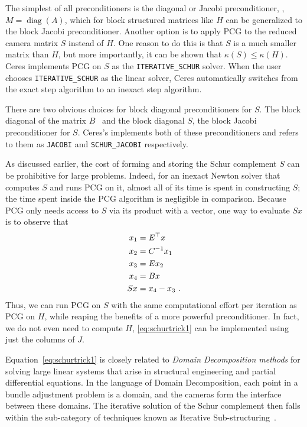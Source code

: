 The simplest of all preconditioners is the diagonal or Jacobi preconditioner, \ie,  $M=\operatorname{diag}(A)$, which for block structured matrices like $H$ can be generalized to the block Jacobi preconditioner. Another option is to apply PCG to the reduced camera matrix $S$ instead of $H$. One reason to do this is that $S$ is a much smaller matrix than $H$, but more importantly, it can be shown that $\kappa(S)\leq \kappa(H)$.  Ceres implements PCG on $S$ as the \texttt{ITERATIVE\_SCHUR} solver. When the user chooses \texttt{ITERATIVE\_SCHUR} as the linear solver, Ceres automatically switches from the exact step algorithm to an inexact step algorithm.


There are two obvious choices for block diagonal preconditioners for $S$. The block diagonal of the matrix $B$~\cite{mandel1990block} and the block diagonal $S$, \ie the block Jacobi preconditioner for $S$. Ceres's implements both of these preconditioners and refers to them as  \texttt{JACOBI} and \texttt{SCHUR\_JACOBI} respectively.

As discussed earlier, the cost of forming and storing the Schur complement $S$ can be prohibitive for large problems. Indeed, for an inexact Newton solver that computes $S$ and runs PCG on it, almost all of its time is spent in constructing $S$; the time spent inside the PCG algorithm is negligible in comparison. Because  PCG only needs access to $S$ via its product with a vector, one way to evaluate $Sx$ is to observe that
\begin{align}
  x_1 &= E^\top x \notag \\
  x_2 &= C^{-1} x_1 \notag\\
  x_3 &= Ex_2 \notag\\
  x_4 &= Bx \notag\\
  Sx &= x_4 - x_3\ .\label{eq:schurtrick1}
\end{align}
Thus, we can run PCG on $S$ with the same computational effort per iteration as PCG on $H$, while reaping the benefits of a more powerful preconditioner. In fact, we do not even need to compute $H$, \eqref{eq:schurtrick1} can be implemented using just the columns of $J$.

Equation~\eqref{eq:schurtrick1} is closely related to {\em Domain Decomposition methods} for solving large linear systems that arise in structural engineering and partial differential equations. In the language of Domain Decomposition, each point in a bundle adjustment problem is a domain, and the cameras form the interface between these domains. The iterative solution of the Schur complement then falls within the sub-category of techniques known as Iterative Sub-structuring~\cite{saad2003iterative,mathew2008domain}.

